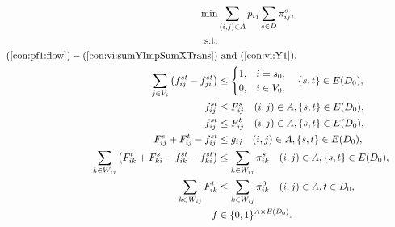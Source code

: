 \begin{subequations}[resume]
\begin{align}
\notag\min & \sum\limits_{(i,j) \in A} p_{ij} \sum\limits_{s \in D} \pi^s_{ij},\\ \notag
\text{s.t.}& && \\
\notag(\ref{con:pf1:flow})-(\ref{con:vi:sumYImpSumXTrans}) & ~\text{and} ~(\ref{con:vi:Y1}), \\
\label{con:pf2:flowHook} \sum\limits_{\substack{ j \in V_i }}\left(f^{st}_{ij}-f^{st}_{ji}\right) & \leq 
  \begin{cases}
    1, & i = s_0, \\
    0, & i\in V_0,
  \end{cases} \quad \{s,t\}\in E(D_0), \\
\label{con:pf2:startInSource}  f^{st}_{ij} & \leq F^s_{ij} \quad (i,j)\in A, \{s,t\}\in E(D_0),\\
\label{con:pf2:stopInDest}  f^{st}_{ij} & \leq F^t_{ij} \quad (i,j)\in A, \{s,t\}\in E(D_0),\\
\label{con:pf2:stronger}  F^{s}_{ij}+F^{t}_{ij}-f^{st}_{ij} &\leq g_{ij} \quad (i,j)\in A, \{s,t\}\in E(D_0),\\ 
\label{con:pf2:sumFImpSumY} \sum\limits_{k\in W_{ij}}\left(F^{t}_{ik} + F^{s}_{ki} - f^{st}_{ik} - f^{st}_{ki}\right) & \leq \sum\limits_{k\in W_{ij}}  \pi^{s}_{ik} \quad (i,j)\in A,\{s,t\}\in E(D_0),\\
\label{con:pf2:sumFImpSumY2} \sum\limits_{k\in W_{ij}}F^{t}_{ik} & \leq \sum\limits_{k\in W_{ij}}  \pi^{0}_{ik} \quad (i,j)\in A, t\in D_0,\\
\label{con:pf2:dim} f&\in\{0,1\}^{A\times E(D_0)}.
\end{align}~
\end{subequations}

